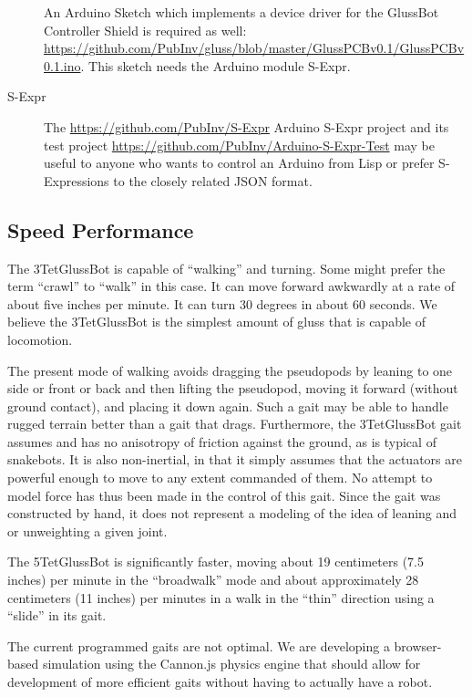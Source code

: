 \documentclass[11pt]{article}
\begin{document}
\begin{description}
An Arduino Sketch which implements a device driver for the GlussBot Controller Shield is required as well:\\
\url{https://github.com/PubInv/gluss/blob/master/GlussPCBv0.1/GlussPCBv0.1.ino}.
     This sketch needs the Arduino module S-Expr.
     
\item [S-Expr]
  The \url{https://github.com/PubInv/S-Expr} Arduino S-Expr project and its
  test project
  \url{https://github.com/PubInv/Arduino-S-Expr-Test} 
  may be useful to anyone who wants to control an Arduino from Lisp or prefer S-Expressions to the closely related JSON format.

  
\end{description}

\subsection{Speed Performance}

The 3TetGlussBot is capable of ``walking'' and turning. Some might prefer the term ``crawl'' to ``walk'' in
this case. It can move forward awkwardly at a rate
of about five inches per minute. It can turn 30 degrees in about 60 seconds.
We believe the 3TetGlussBot is the simplest amount of gluss that is capable of locomotion.

The present mode of walking avoids dragging the pseudopods by leaning to one side or front or back and
then lifting the pseudopod, moving it forward (without ground contact), and placing it down again.
Such a gait may be able to handle rugged terrain better than a gait that drags. Furthermore, the
3TetGlussBot gait assumes and has no anisotropy of friction against the ground, as is typical
of snakebots.
It is also non-inertial, in that it simply assumes that the actuators are powerful enough to
move to any extent commanded of them. No attempt to model force has thus been made in the control of this gait.
Since the gait was constructed by hand, it does not represent a modeling of the idea of leaning and or
unweighting a given joint.

The 5TetGlussBot is significantly faster, moving about 19 centimeters (7.5 inches)
per minute in the ``broadwalk'' mode
and about approximately 28 centimeters (11 inches) per minutes in a walk in the ``thin'' direction using a ``slide'' in its gait.

The current programmed gaits are not optimal.
We are developing a browser-based simulation using the Cannon.js physics engine that should allow for development
of more efficient gaits without having to actually have a robot.
\end{document}
